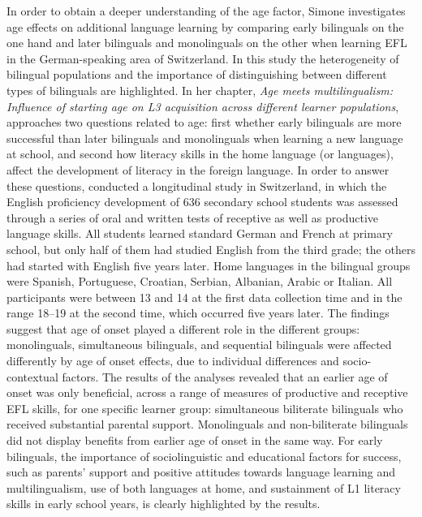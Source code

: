\documentclass[output=paper,colorlinks,citecolor=brown,nonflat]{langsci/langscibook}
\begin{document}
In order to obtain a deeper understanding of the age factor, Simone \citeauthor{chapters/pfenninger} investigates age effects on additional language learning by comparing early bilinguals on the one hand and later bilinguals and monolinguals on the other when learning EFL in the German-speaking area of Switzerland. In this study the heterogeneity of bilingual populations and the importance of distinguishing between different types of bilinguals are highlighted. In her chapter, \textit{Age meets multilingualism: Influence of starting age on L3 acquisition across different learner populations}, \citeauthor{chapters/pfenninger} approaches two questions related to age: first whether early bilinguals are more successful than later bilinguals and monolinguals when learning a new language at school, and second how literacy skills in the home language (or languages), affect the development of literacy in the foreign language. In order to answer these questions, \citeauthor{chapters/pfenninger} conducted a longitudinal study in Switzerland, in which the English proficiency development of 636 secondary school students was assessed through a series of oral and written tests of receptive as well as productive language skills. All students learned standard German and French at primary school, but only half of them had studied English from the third grade; the others had started with English five years later. Home languages in the bilingual groups were Spanish, Portuguese, Croatian, Serbian, Albanian, Arabic or Italian. All participants were between 13 and 14 at the first data collection time and in the range 18--19 at the second time, which occurred five years later. The findings suggest that age of onset played a different role in the different groups: monolinguals, simultaneous bilinguals, and sequential bilinguals were affected differently by age of onset effects, due to individual differences and socio-contextual factors. The results of the analyses revealed that an earlier age of onset was only beneficial, across a range of measures of productive and receptive EFL skills, for one specific learner group: simultaneous biliterate bilinguals who received substantial parental support. Monolinguals and non-biliterate bilinguals did not display benefits from earlier age of onset in the same way. For early bilinguals, the importance of sociolinguistic and educational factors for success, such as parents’ support and positive attitudes towards language learning and multilingualism, use of both languages at home, and sustainment of L1 literacy skills in early school years, is clearly highlighted by the results.
\end{document}
